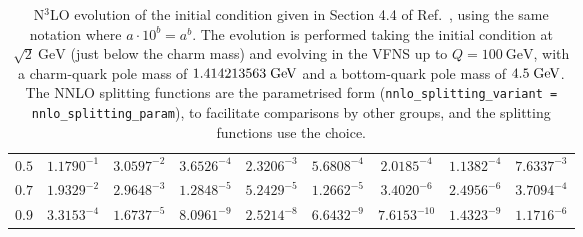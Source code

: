 \begin{table}[p]
\begin{tabular}{c|cccccccc}
$0.5$    &  $1.1790^{-1}$ &  $3.0597^{-2}$ &  $3.6526^{-4}$ &  $2.3206^{-3}$ &  $5.6808^{-4}$ &  $2.0185^{-4}$ &  $1.1382^{-4}$ &  $7.6337^{-3}$ \\
$0.7$    &  $1.9329^{-2}$ &  $2.9648^{-3}$ &  $1.2848^{-5}$ &  $5.2429^{-5}$ &  $1.2662^{-5}$ &  $3.4020^{-6}$ &  $2.4956^{-6}$ &  $3.7094^{-4}$ \\
$0.9$    &  $3.3153^{-4}$ &  $1.6737^{-5}$ &  $8.0961^{-9}$ &  $2.5214^{-8}$ &  $6.6432^{-9}$ &  $7.6153^{-10}$ &  $1.4323^{-9}$ &  $1.1716^{-6}$ 
  \end{tabular}
  \caption{N$^3$LO evolution of the initial condition given in Section
    4.4 of Ref.~\cite{Dittmar:2005ed}, using the same notation where
    $a\cdot10^{b} = a^b$. The evolution is performed taking the
    initial condition at $\sqrt{2}~\text{GeV}$ (just below the charm
    mass) and evolving in the VFNS up to $Q=100~\text{GeV}$, with a
    charm-quark pole mass of $1.414213563\;\mathrm{GeV}$ and a bottom-quark
    pole mass of $4.5\;\mathrm{GeV}$.
    The NNLO splitting functions are the parametrised form
    (\texttt{nnlo\_splitting\_variant = nnlo\_splitting\_param}), to 
    facilitate comparisons by other groups, and the \ntlo splitting
    functions use the
     choice.}
  \label{tab:n3lo-evolve}
\end{table}

